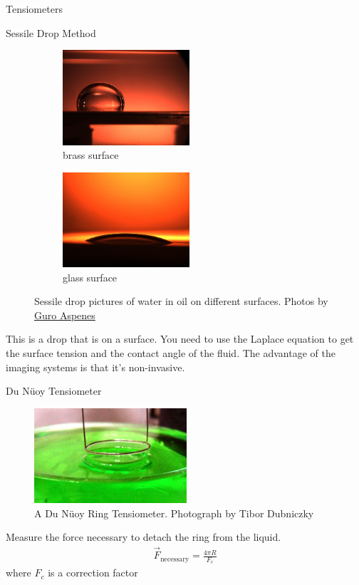 \documentclass{article}
\begin{document}
\begin{section}{Tensiometers}
\begin{subsection}{Sessile Drop Method}
	\begin{figure}[h]
		\centering
		\begin{subfigure}[b]{0.3\textwidth}
			\includegraphics[height=100pt]{Water_droplet_in_oil_on_brass_surface}
			\caption{brass surface}
		\end{subfigure}
	\begin{subfigure}[b]{0.3\textwidth}
		\includegraphics[height=100pt]{Water_droplet_in_oil_on_glass_surface}
		\caption{glass surface}
	\end{subfigure}
	\caption{Sessile drop pictures of water in oil on different surfaces. Photos by \href{https://commons.wikimedia.org/wiki/File:Water\_droplet\_in\_oil\_on\_brass\_surface.JPG}{Guro Aspenes}}
	\end{figure}
	This is a drop that is on a surface. You need to use the Laplace equation to get the surface tension and the contact angle of the fluid. The advantage of the imaging systems is that it's non-invasive. 
\end{subsection}
\begin{subsection}{Du N\"uoy Tensiometer}
	\begin{figure}[h]
		\centering
		\includegraphics[height=100pt]{dunuoyring}
		\caption{A Du N\"uoy Ring Tensiometer. Photograph by Tibor Dubniczky}
		\label{fig:dunuoy}
	\end{figure}
	Measure the force necessary to detach the ring from the liquid.
	\begin{align*}
		\vec{F}_\text{necessary} = \frac{4\pi R}{F_c}
	\end{align*} where $F_c$ is a correction factor


\end{subsection}
\end{section}
\end{document}
